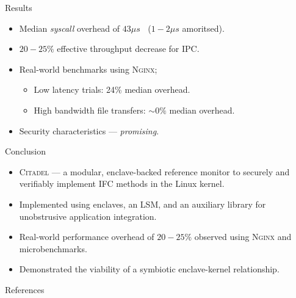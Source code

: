 \documentclass[xcolor=dvipsnames]{beamer}
\begin{document}
\begin{frame}{Results}
    \begin{itemize}
        \item Median \textit{syscall} overhead of $43\mu s\;\;$ ($1-2 \mu s$ amoritsed). \\ 
        \vspace{5mm}
        \item $20-25\%$ effective throughput decrease for IPC. \\ 
        \vspace{5mm}
        \item Real-world benchmarks using \textsc{Nginx};
        \begin{itemize}
            \item Low latency trials: 24\% median overhead.
            \item High bandwidth file transfers: $\sim 0\%$ median overhead.
        \end{itemize}

        
        \vspace{5mm}
        \item Security characteristics --- \textit{promising}.
    \end{itemize}
\end{frame}

\begin{frame}{Conclusion}
    \begin{itemize}
        \item \textsc{Citadel} ---  a modular, enclave-backed reference monitor to securely and verifiably implement IFC methods in the Linux kernel.
        \item Implemented using enclaves, an LSM, and an auxiliary library for unobstrusive application integration.
        \item Real-world performance overhead of $20-25\%$ observed using \textsc{Nginx} and microbenchmarks.
        \item Demonstrated the viability of a symbiotic enclave-kernel relationship.
    \end{itemize}
\end{frame}

\begin{frame}{References}
    
\end{frame}
\end{document}
